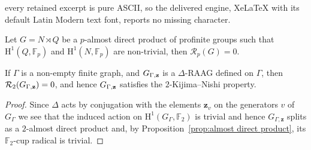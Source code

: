 \documentclass[10pt,a4paper]{amsart}
\newcommand{\FF}{\mathbb{F}}
\newcommand{\calR}{\mathcal{R}}
\newcommand{\rmH}{\mathrm H}%
\begin{document}
every retained excerpt is pure ASCII, so the delivered engine, XeLaTeX with its default Latin Modern text font, reports no missing character.
\begin{prop}
\label{prop:almost direct product}
    Let $G=N\rtimes Q$ be a $p$-almost direct product of profinite groups such that $\rmH^1(Q,\FF_p)$ and $\rmH^1(N,\FF_p)$ are non-trivial, then $\calR_p(G)=0$.
\end{prop}

\begin{prop}
\label{prop:D-RAAGs have KN}
    If $\Gamma$ is a non-empty finite graph, and $G_{\Gamma,\bf z}$ is a $\Delta$-RAAG defined on $\Gamma$, then $\calR_2(G_{\Gamma,\bf z})=0$, and hence $G_{\Gamma,\bf z}$ satisfies the $2$-Kijima--Nishi property.
\end{prop}

\begin{proof}
{%
Since $\Delta$ acts by conjugation with the elements $\mathbf{z}_v$ on the generators $v$ of $G_\Gamma$ we see that the induced action on $\rmH^1(G_\Gamma,\FF_2)$ is trivial and hence $G_{\Gamma,\mathbf{z}}$ splits as a $2$-almost direct product and, by Proposition~\ref{prop:almost direct product}, its $\FF_2$-cup radical is trivial.}
\end{proof}
\end{document}
